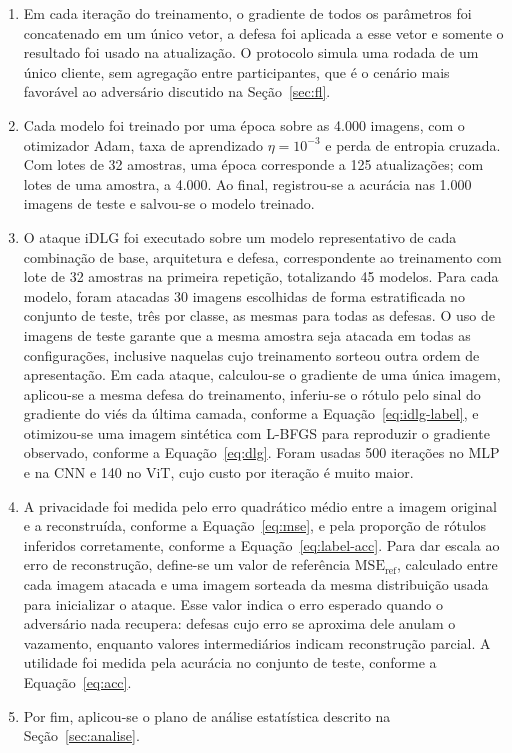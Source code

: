 \begin{enumerate}
  \item Em cada iteração do treinamento, o gradiente de todos os parâmetros foi concatenado em um único vetor, a defesa foi aplicada a esse vetor e somente o resultado foi usado na atualização. O protocolo simula uma rodada de um único cliente, sem agregação entre participantes, que é o cenário mais favorável ao adversário discutido na Seção~\ref{sec:fl}.

  \item Cada modelo foi treinado por uma época sobre as 4.000 imagens, com o otimizador Adam, taxa de aprendizado $\eta = 10^{-3}$ e perda de entropia cruzada. Com lotes de 32 amostras, uma época corresponde a 125 atualizações; com lotes de uma amostra, a 4.000. Ao final, registrou-se a acurácia nas 1.000 imagens de teste e salvou-se o modelo treinado.

  \item O ataque iDLG foi executado sobre um modelo representativo de cada combinação de base, arquitetura e defesa, correspondente ao treinamento com lote de 32 amostras na primeira repetição, totalizando 45 modelos. Para cada modelo, foram atacadas 30 imagens escolhidas de forma estratificada no conjunto de teste, três por classe, as mesmas para todas as defesas. O uso de imagens de teste garante que a mesma amostra seja atacada em todas as configurações, inclusive naquelas cujo treinamento sorteou outra ordem de apresentação. Em cada ataque, calculou-se o gradiente de uma única imagem, aplicou-se a mesma defesa do treinamento, inferiu-se o rótulo pelo sinal do gradiente do viés da última camada, conforme a Equação~\ref{eq:idlg-label}, e otimizou-se uma imagem sintética com L-BFGS para reproduzir o gradiente observado, conforme a Equação~\ref{eq:dlg}. Foram usadas 500 iterações no MLP e na CNN e 140 no ViT, cujo custo por iteração é muito maior.

  \item A privacidade foi medida pelo erro quadrático médio entre a imagem original e a reconstruída, conforme a Equação~\ref{eq:mse}, e pela proporção de rótulos inferidos corretamente, conforme a Equação~\ref{eq:label-acc}. Para dar escala ao erro de reconstrução, define-se um valor de referência $\mathrm{MSE}_{\text{ref}}$, calculado entre cada imagem atacada e uma imagem sorteada da mesma distribuição usada para inicializar o ataque. Esse valor indica o erro esperado quando o adversário nada recupera: defesas cujo erro se aproxima dele anulam o vazamento, enquanto valores intermediários indicam reconstrução parcial. A utilidade foi medida pela acurácia no conjunto de teste, conforme a Equação~\ref{eq:acc}.

  \item Por fim, aplicou-se o plano de análise estatística descrito na Seção~\ref{sec:analise}.
\end{enumerate}

